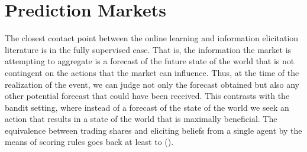 






\section{Prediction Markets} 

The closest contact point between the online learning and information elicitation literature is in the fully supervised case.
That is, the information the market is attempting to aggregate is a forecast of the future state of the world that is not contingent on the actions that the market can influence. Thus, at the time of the realization of the event, we can judge not only the forecast obtained but also any other potential forecast that could have been received. 
This contrasts with the bandit setting, where instead of a forecast of the state of the world we seek an action that results in a state of the world that is maximally beneficial.
The equivalence between trading shares and eliciting beliefs from a single agent by the means of scoring rules goes back at least to (\cite{savage1971elicitation}). 



